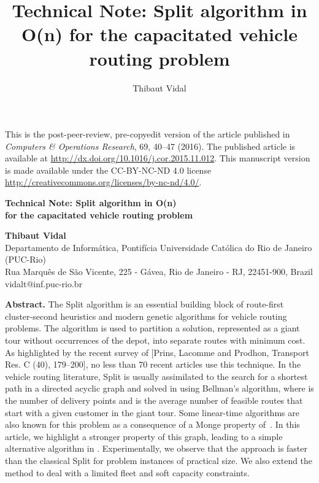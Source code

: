 \documentclass[11pt]{article}
\title{Technical Note: Split algorithm in O(n) for the capacitated vehicle routing problem}
\author{Thibaut Vidal}
\newcommand{\blue}[1]{{#1}}
\begin{document}
\vspace*{-1.8cm}

\begin{scriptsize}
\noindent
This is the post-peer-review, pre-copyedit version of the article published in \emph{Computers \& Operations Research}, 69, 40--47 (2016). The published article is available at \url{http://dx.doi.org/10.1016/j.cor.2015.11.012}. This manuscript version is made available under the CC-BY-NC-ND 4.0 license \url{http://creativecommons.org/licenses/by-nc-nd/4.0/}.\par
\end{scriptsize}

\vspace*{0.8cm}

\begin{center}

\begin{LARGE}
{\textbf{Technical Note: Split algorithm in O(n) \\ \vspace*{0.2cm}  for the \blue{capacitated} vehicle routing  problem}}
\end{LARGE}

\vspace*{1.2cm}

\textbf{Thibaut Vidal} \\
Departamento de Inform\'atica, Pontif\'icia Universidade Cat\'olica do Rio de Janeiro (PUC-Rio) \\
Rua Marqu\^es de S\~ao Vicente, 225 - G\'avea, Rio de Janeiro - RJ, 22451-900, Brazil \\
vidalt@inf.puc-rio.br \\

\vspace*{1cm}

\end{center}
\noindent
\textbf{Abstract.}
The Split algorithm is an essential building block of route-first cluster-second heuristics and modern genetic algorithms for vehicle routing problems. \blue{The algorithm is used to partition a solution, represented as a giant tour without occurrences of the depot, into separate routes with minimum cost.}
As highlighted by the recent survey of [Prins, Lacomme and Prodhon, Transport Res. C (40), 179--200], no less than 70 recent articles use this technique. In the vehicle routing literature, Split is usually assimilated to the search for a shortest path in a directed acyclic graph  and solved in  using Bellman's algorithm, where  is the number of delivery points and \blue{ is the average number of feasible routes that start with a given customer in the giant tour.}
Some linear-time algorithms are also known for this problem as a consequence of a Monge property of~. In this article, we highlight a stronger property of this graph, leading to a \blue{simple} alternative algorithm in . Experimentally, we observe that the approach is faster than the classical Split for problem instances of practical size. We also extend the method to deal with a limited fleet and soft capacity constraints.
\vspace*{0.3cm}
\end{document}
